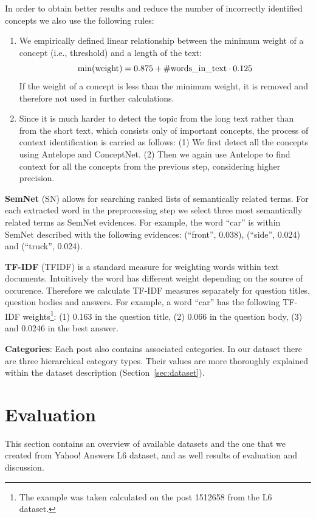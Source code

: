 \documentclass[conference]{IEEEtran}
\newcommand{\secref}[1]{Section~\ref{#1}}
\begin{document}
In order to obtain better results and reduce the number of incorrectly identified concepts we also use the following rules:
\begin{enumerate}
	\item We empirically defined linear relationship between the minimum weight of a concept (i.e., threshold) and a length of the text:
$$
	{\rm min(weight)} = 0.875 + {\rm \#words\_in\_text} \cdot 0.125
$$
If the weight of a concept is less than the minimum weight, it is removed and therefore not used in further calculations.
	\item Since it is much harder to detect the topic from the long text rather than from the short text, which consists only of important concepts, the process of context identification is carried as follows: (1) We first detect all the concepts using Antelope and ConceptNet. (2) Then we again use Antelope to find context for all the concepts from the previous step, considering higher precision.
\end{enumerate}

{\bf SemNet} (SN) allows for searching ranked lists of semantically related terms. For each extracted word in the preprocessing step we select three most semantically related terms as SemNet evidences. For example, the word ``car'' is within SemNet described with the following evidences: (``front'', 0.038), (``side'', 0.024) and (``truck'', 0.024).

{\bf TF-IDF} (TFIDF) is a standard measure for weighting words within text documents. Intuitively the word has different weight depending on the source of occurence. Therefore we calculate TF-IDF measures separately for question titles, question bodies and answers. For example, a word ``car'' has the following TF-IDF weights\footnote{The example was taken calculated on the post 1512658 from the L6 dataset.}: (1) 0.163 in the question title, (2) 0.066 in the question body, (3) and 0.0246 in the best answer. 

{\bf Categories}:
Each post also contains associated categories. In our dataset there are three hierarchical category types. Their values are more thoroughly explained within the dataset description (\secref{sec:dataset}).

\vspace{-0.3cm}
\section{Evaluation}
This section contains an overview of available datasets and the one that we created from Yahoo! Answers L6 dataset, and as well results of evaluation and discussion.
\end{document}
